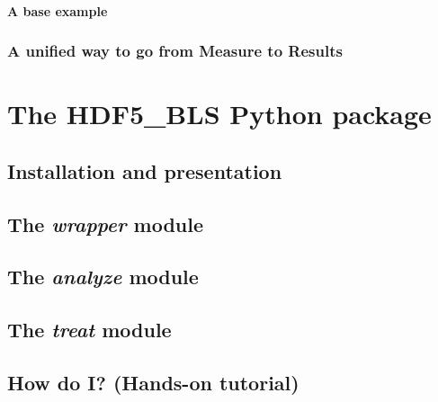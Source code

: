 \documentclass{book}
\newcommand{\mypart}[1]{\setcounter{chapter}{0} \part{#1}}
\begin{document}
        \subsection*{A base example}\label{subsec:preamble.file_structure.some_examples}
            


    \section*{A unified way to go from Measure to Results}
        


\mypart{The HDF5\_BLS Python package}\label{part:tutorial}
    \chapter*{Installation and presentation}\label{chapter:HDF5_BLS.installation}
        

    \chapter{The \textit{wrapper} module}\label{chapter:HDF5_BLS.wrapper}
        

    \chapter{The \textit{analyze} module}\label{chapter:HDF5_BLS.analyze}
        

    \chapter{The \textit{treat} module}\label{chapter:HDF5_BLS.treat}

    \chapter{How do I? (Hands-on tutorial)}\label{chapter:HDF5_BLS.how_do_i}
        
\end{document}
